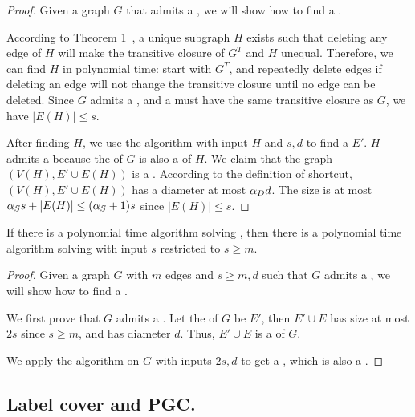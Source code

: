 \begin{proof}
	Given a graph $G$ that admits a , we will show how to find a .
	
	According to Theorem 1~\cite{AhoGU72}, a unique subgraph $H$ exists such that deleting any edge of $H$ will make the transitive closure of $G^T$ and $H$ unequal. Therefore, we can find $H$ in polynomial time: start with $G^T$, and repeatedly delete edges if deleting an edge will not change the transitive closure until no edge can be deleted. Since $G$ admits a , and a \tc{} must have the same transitive closure as $G$, we have $|E(H)|\le s$. %
 
 After finding $H$, we use the \ssss{\apxS}{\apxD} algorithm with input $H$ and $s,d$ to find a  $E'$. $H$ admits a  because the  of $G$ is also a  of $H$. We claim that the graph $(V(H), E'\cup E(H))$ is a . According to the definition of shortcut, $(V(H), E'\cup E(H))$ has a diameter at most $\alpha_D d$. The size is at most $\alpha_S s+|E(H)|\le (\alpha_S+1) s$ since $|E(H)|\le s$.
	
\end{proof}


\begin{lemma}\label{lem:redShtoTC}
	If there is a polynomial time algorithm solving \TC{\apxS}{\apxD}, then there is a polynomial time algorithm solving \oss{2\apxS}{\apxD} with input $s$ restricted to $s\ge m$.
\end{lemma}
\begin{proof}
	Given a graph $G$ with $m$ edges and $s\ge m,d$ such that $G$ admits a , we will show how to find a . 
 
        We first prove that $G$ admits a . Let the  of $G$ be $E'$, then $E'\cup E$ has size at most $2s$ since $s\ge m$, and has diameter $d$. Thus, $E'\cup E$ is a  of $G$. 
        
        We apply the \TC{\apxS}{\apxD} algorithm on $G$ with inputs $2s,d$ to get a , which is also a . 
 
	
\end{proof}

\subsection{Label cover and PGC.}\label{subsec:labcov}

